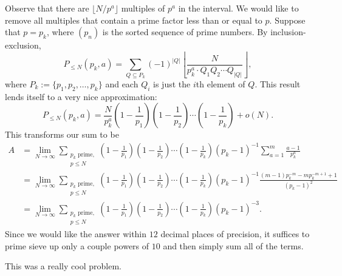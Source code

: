 \documentclass[a4paper, 12pt]{article}
\begin{document}
\begin{solution}
    Observe that there are \( \lfloor N / p^a \rfloor \) multiples of \( p^a \) in the interval. We would like to remove all multiples that contain a prime factor less than or equal to \( p \). Suppose that \( p = p_k \), where \( (p_n) \) is the sorted sequence of prime numbers. By inclusion-exclusion,
    \[
        P_{\le N}(p_k, a) = \sum_{Q \subseteq P_k} (-1)^{|Q|} \left \lfloor \frac{N}{p_k^a \cdot Q_1 Q_2 \cdots Q_{|Q|}}\right\rfloor
    ,\]
    where \( P_k := \{ p_1, p_2, \ldots, p_{k} \} \) and each \( Q_i \) is just the \( i \)th element of \( Q \). This result lends itself to a very nice approximation:
    \[
        P_{\le N}(p_k, a) = \frac{N}{p_k^a} \left( 1 - \frac{1}{p_1} \right) \left( 1 - \frac{1}{p_2} \right) \cdots \left( 1 - \frac{1}{p_{k}} \right) + o(N)
    .\]
    This transforms our sum to be
    \begin{align*}
        A &= \lim_{N \to \infty} \sum\limits_{\substack{p_k \textrm{ prime,}  \\ p \le N}} \left( 1 - \frac{1}{p_1} \right) \left( 1 - \frac{1}{p_2} \right) \cdots \left( 1 - \frac{1}{p_{k}} \right) (p_k-1)^{-1} \sum_{a = 1}^{m} \frac{a - 1}{p_k^a} \\
        &= \lim_{N \to \infty} \sum\limits_{\substack{p_k \textrm{ prime,}  \\ p \le N}} \left( 1 - \frac{1}{p_1} \right) \left( 1 - \frac{1}{p_2} \right) \cdots \left( 1 - \frac{1}{p_{k}} \right) (p_k-1)^{-1} \frac{(m-1)p_k^{-m} - m p_k^{-m + 1} + 1}{(p_k-1)^2} \\
        &= \lim_{N \to \infty} \sum\limits_{\substack{p_k \textrm{ prime,}  \\ p \le N}} \left( 1 - \frac{1}{p_1} \right) \left( 1 - \frac{1}{p_2} \right) \cdots \left( 1 - \frac{1}{p_{k}} \right) (p_k-1)^{-3}
    .\end{align*}
    Since we would like the answer within \( 12 \) decimal places of precision, it suffices to prime sieve up only a couple powers of \( 10 \) and then simply sum all of the terms.

    This was a really cool problem.
\end{solution}
\end{document}

